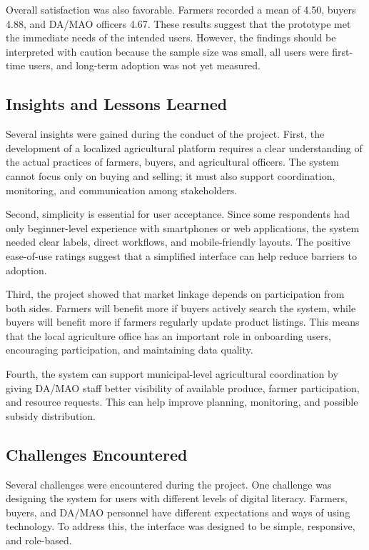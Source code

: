 Overall satisfaction was also favorable. Farmers recorded a mean of 4.50, buyers 4.88, and DA/MAO officers 4.67. These results suggest that the prototype met the immediate needs of the intended users. However, the findings should be interpreted with caution because the sample size was small, all users were first-time users, and long-term adoption was not yet measured.

\subsection{Insights and Lessons Learned}

Several insights were gained during the conduct of the project. First, the development of a localized agricultural platform requires a clear understanding of the actual practices of farmers, buyers, and agricultural officers. The system cannot focus only on buying and selling; it must also support coordination, monitoring, and communication among stakeholders.

Second, simplicity is essential for user acceptance. Since some respondents had only beginner-level experience with smartphones or web applications, the system needed clear labels, direct workflows, and mobile-friendly layouts. The positive ease-of-use ratings suggest that a simplified interface can help reduce barriers to adoption.

Third, the project showed that market linkage depends on participation from both sides. Farmers will benefit more if buyers actively search the system, while buyers will benefit more if farmers regularly update product listings. This means that the local agriculture office has an important role in onboarding users, encouraging participation, and maintaining data quality.

Fourth, the system can support municipal-level agricultural coordination by giving DA/MAO staff better visibility of available produce, farmer participation, and resource requests. This can help improve planning, monitoring, and possible subsidy distribution.

\subsection{Challenges Encountered}

Several challenges were encountered during the project. One challenge was designing the system for users with different levels of digital literacy. Farmers, buyers, and DA/MAO personnel have different expectations and ways of using technology. To address this, the interface was designed to be simple, responsive, and role-based.

